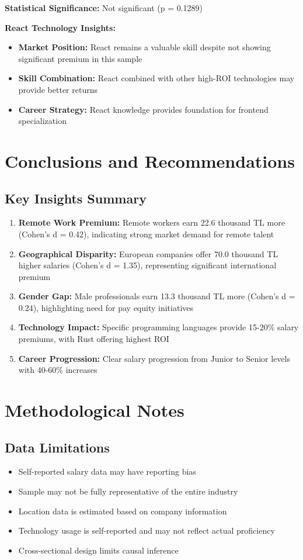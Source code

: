 \documentclass[12pt,a4paper]{article}
\begin{document}
\textbf{Statistical Significance:} Not significant (p = 0.1289)

\textbf{React Technology Insights:}
\begin{itemize}
    \item \textbf{Market Position:} React remains a valuable skill despite not showing significant premium in this sample
    \item \textbf{Skill Combination:} React combined with other high-ROI technologies may provide better returns
    \item \textbf{Career Strategy:} React knowledge provides foundation for frontend specialization
\end{itemize}

\section{Conclusions and Recommendations}

\subsection{Key Insights Summary}
\begin{enumerate}
    \item \textbf{Remote Work Premium:} Remote workers earn 22.6 thousand TL more (Cohen's d = 0.42), indicating strong market demand for remote talent
    \item \textbf{Geographical Disparity:} European companies offer 70.0 thousand TL higher salaries (Cohen's d = 1.35), representing significant international premium
    \item \textbf{Gender Gap:} Male professionals earn 13.3 thousand TL more (Cohen's d = 0.24), highlighting need for pay equity initiatives
    \item \textbf{Technology Impact:} Specific programming languages provide 15-20\% salary premiums, with Rust offering highest ROI
    \item \textbf{Career Progression:} Clear salary progression from Junior to Senior levels with 40-60\% increases
\end{enumerate}

\section{Methodological Notes}

\subsection{Data Limitations}
\begin{itemize}
    \item Self-reported salary data may have reporting bias
    \item Sample may not be fully representative of the entire industry
    \item Location data is estimated based on company information
    \item Technology usage is self-reported and may not reflect actual proficiency
    \item Cross-sectional design limits causal inference
\end{itemize}
\end{document}
